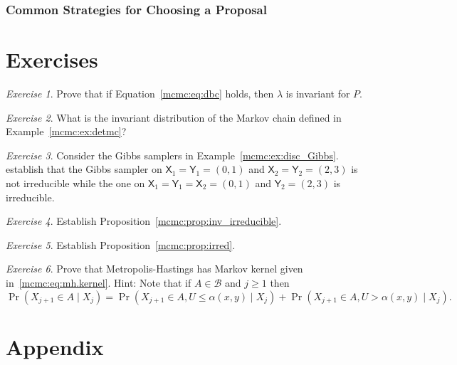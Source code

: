 \documentclass[12pt]{article}
\theoremstyle{plain}
\theoremstyle{definition}
\theoremstyle{remark}
\newtheorem{hw}{Exercise}[section]
\newcommand{\X}{\mathsf{X}}
\newcommand{\Y}{\mathsf{Y}}
\newcommand{\B}{\mathcal{B}}
\begin{document}
\subsubsection{Common Strategies for Choosing a Proposal}
\label{mcmc:sec:choosing.proposal'}

\section*{Exercises}
\begin{hw}
  \label{mcmc:hw:dbc}
Prove that if Equation~\ref{mcmc:eq:dbc} holds, then $\lambda$ is
invariant for $P$.
\end{hw}

\begin{hw}
What is the invariant distribution of the Markov chain defined in
Example~\ref{mcmc:ex:detmc}?
\end{hw}

\begin{hw}
  Consider the Gibbs samplers in Example~\ref{mcmc:ex:disc_Gibbs}.
  establish that the Gibbs sampler on $\X_1 = \Y_1 = (0,1)$ and
  $\X_2 = \Y_2 = (2,3)$ is not irreducible while the one on
  $\X_1 = \Y_1 = \X_2 = (0,1)$ and $ \Y_2 = (2,3)$ is irreducible.
\end{hw}

\begin{hw}
Establish Proposition~\ref{mcmc:prop:inv_irreducible}.
\end{hw}

\begin{hw}
  Establish Proposition~\ref{mcmc:prop:irred}.
\end{hw}

\begin{hw}
  Prove that Metropolis-Hastings  has Markov
  kernel given in~\eqref{mcmc:eq:mh.kernel}.  Hint: Note that if $A \in \B$
  and $j \ge 1$ then
  \[
    \Pr( X_{j+1} \in A \mid X_j) = \Pr(X_{j+1} \in A , U \le
    \alpha(x, y) \mid X_j) +  \Pr(X_{j+1} \in A , U >
    \alpha(x, y) \mid X_j) .
    \]
  \end{hw}




\newpage

\section*{Appendix}





\end{document}
